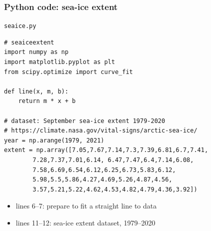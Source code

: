 \documentclass[english,14pt]{beamer}
\begin{document}

\begin{frame}[fragile]

\frametitle{Python code: sea-ice extent}

\vspace*{-3mm}

\texttt{seaice.py}
\begin{lstlisting}[style=CStyle,basicstyle=\scriptsize]
# seaiceextent
import numpy as np
import matplotlib.pyplot as plt
from scipy.optimize import curve_fit

def line(x, m, b):
    return m * x + b

# dataset: September sea-ice extent 1979-2020
# https://climate.nasa.gov/vital-signs/arctic-sea-ice/
year = np.arange(1979, 2021)
extent = np.array([7.05,7.67,7.14,7.3,7.39,6.81,6.7,7.41,
        7.28,7.37,7.01,6.14, 6.47,7.47,6.4,7.14,6.08,
        7.58,6.69,6.54,6.12,6.25,6.73,5.83,6.12,
        5.98,5.5,5.86,4.27,4.69,5.26,4.87,4.56,
        3.57,5.21,5.22,4.62,4.53,4.82,4.79,4.36,3.92])
\end{lstlisting}

\begin{itemize}
	\item lines 6--7: prepare to fit a straight line to data
	\item lines 11--12: sea-ice extent dataset, 1979--2020
\end{itemize}

\end{frame}

\end{document}
